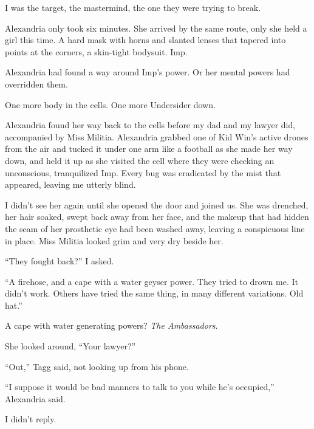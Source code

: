 I was the target, the mastermind, the one they were trying to break.



Alexandria only took six minutes.  She arrived by the same route, only she held a girl this time.  A hard mask with horns and slanted lenses that tapered into points at the corners, a skin-tight bodysuit.  Imp.



Alexandria had found a way around Imp's power.  Or her mental powers had overridden them.



One more body in the cells.  One more Undersider down.



Alexandria found her way back to the cells before my dad and my lawyer did, accompanied by Miss Militia.  Alexandria grabbed one of Kid Win's active drones from the air and tucked it under one arm like a football as she made her way down, and held it up as she visited the cell where they were checking an unconscious, tranquilized Imp.  Every bug was eradicated by the mist that appeared, leaving me utterly blind.



I didn't see her again until she opened the door and joined us.  She was drenched, her hair soaked, swept back away from her face, and the makeup that had hidden the seam of her prosthetic eye had been washed away, leaving a conspicuous line in place.  Miss Militia looked grim and very dry beside her.



``They fought back?''  I asked.



``A firehose, and a cape with a water geyser power.  They tried to drown me.  It didn't work.  Others have tried the same thing, in many different variations.  Old hat.''



A cape with water generating powers?  \emph{The Ambassadors}.



She looked around, ``Your lawyer?''



``Out,'' Tagg said, not looking up from his phone.



``I suppose it would be bad manners to talk to you while he's occupied,'' Alexandria said.



I didn't reply.



